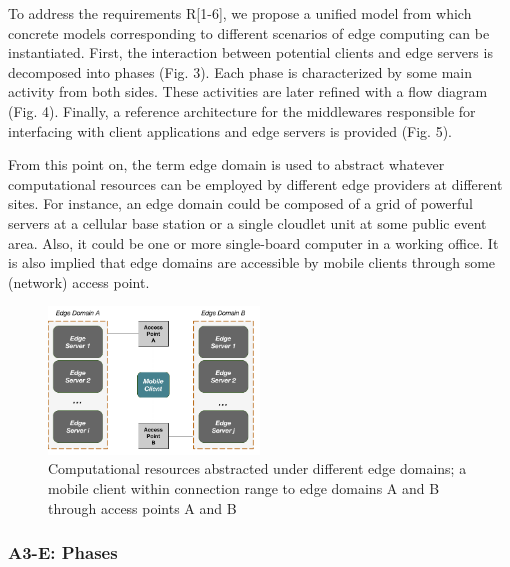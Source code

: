 To address the requirements R[1-6], we propose a unified model from which concrete models corresponding to different scenarios of edge computing can be instantiated. 
First, the interaction between potential clients and edge servers is decomposed into phases (Fig. 3). Each phase is characterized by some main activity from both sides. These activities are later refined with a flow diagram (Fig. 4). Finally, a reference architecture for the middlewares responsible for interfacing with client applications and edge servers is provided (Fig. 5).

From this point on, the term edge domain is used to abstract whatever computational resources can be employed by different edge providers at different sites. For instance, an edge domain could be composed of a grid of powerful servers at a cellular base station or a single cloudlet unit at some public event area. Also, it could be one or more single-board computer in a working office. It is also implied that edge domains are accessible by mobile clients through some (network) access point.

\begin{figure}
  \includegraphics[width=0.5\textwidth]{figs/edge-domain-client.png}
  \caption{Computational resources abstracted under different edge domains; a mobile client within connection range to edge domains A and B through access points A and B}
  \label{fig:edge-domain-client}
\end{figure}

\subsubsection{A3-E: Phases}

